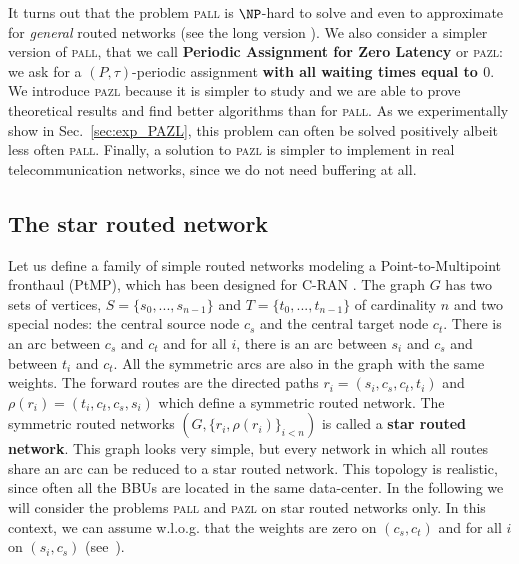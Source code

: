 \documentclass[10pt, conference, letterpaper]{IEEEtran}
\newcommand{\todo}[1]{{\color{red} TODO: {#1}}}
\newcommand\pazl{\textsc{pazl}\xspace}
\newcommand\pall{\textsc{pall}\xspace}
\begin{document}
      It turns out that the problem \pall is $\NP$-hard to solve and even to approximate for \emph{general} routed networks (see the long version \cite{versionlongue}).      
        We also consider a simpler version of \pall, that we call {\bf Periodic Assignment for Zero Latency} or \pazl: we ask for a $(P,\tau)$-periodic assignment {\bf with all waiting times equal to $0$}. We introduce \pazl because it is simpler to study and we are able to prove theoretical results and find better algorithms than for \pall. As we  experimentally show in Sec.~\ref{sec:exp_PAZL}, this problem can often be solved positively albeit less often \pall. Finally, a solution to \pazl is simpler to implement in real telecommunication networks, since we do not need buffering at all. 
       
    
    \subsection{The star routed network}
    
     Let us define a family of simple routed networks modeling a Point-to-Multipoint fronthaul (PtMP), which has been designed for C-RAN \cite{tayq2017real}. 
      The graph $G$ has two sets of vertices, $S=\{s_0,...,s_{n-1}\}$ and $T=\{t_0,...,t_{n-1}\}$ of cardinality $n$ and two special nodes:
      the central source node {\bf $c_s$} and the central target node {\bf $c_t$}.
      There is an arc between {\bf $c_s$} and {\bf $c_t$} and for all $i$, there is an arc between $s_i$ and $c_s$ and between $t_i$ and $c_t$.
      All the symmetric arcs are also in the graph with the same weights.
      The forward routes are the directed paths $r_i = (s_i,c_s,c_t,t_i)$ and $\rho(r_i) = (t_i,c_t,c_s,s_i)$ which define a symmetric routed network. 
      The symmetric routed networks $(G, \{r_i,\rho(r_i)\}_{i<n})$ is called a \textbf{star routed network}. This graph looks very simple, but every network in which all routes share an arc can be reduced to a star routed network. This topology is realistic, since often all the BBUs are located in the same data-center. 
      In the following we will consider the problems \pall and \pazl on star routed networks only. 
      In this context, we can assume w.l.o.g. that the weights are zero on $(c_s,c_t)$ and for all $i$ on $(s_i,c_s)$ (see~\cite{versionlongue}).

%      
      
\end{document}
